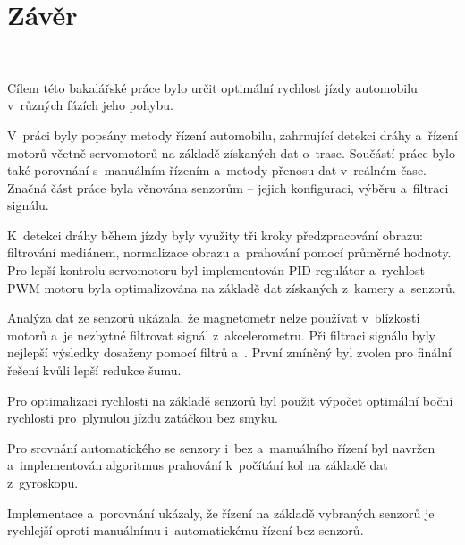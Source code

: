 \chapter{Závěr}
\label{sec:End}
\

Cílem této bakalářské práce bylo určit optimální rychlost jízdy automobilu v~různých
fázích jeho pohybu.

V~práci byly popsány metody řízení automobilu, zahrnující detekci dráhy a~řízení
motorů včetně servomotorů na základě získaných dat o~trase. Součástí práce bylo také
porovnání s~manuálním řízením a~metody přenosu dat v~reálném čase. Značná část práce
byla věnována senzorům – jejich konfiguraci, výběru a~filtraci signálu.

K~detekci dráhy během jízdy byly využity tři kroky předzpracování obrazu: filtrování
mediánem, normalizace obrazu a~prahování pomocí průměrné hodnoty. Pro lepší kontrolu
servomotoru byl implementován PID regulátor a~rychlost PWM motoru byla optimalizována
na základě dat získaných z~kamery a~senzorů.

Analýza dat ze senzorů ukázala, že magnetometr nelze používat v~blízkosti motorů a~je
nezbytné filtrovat signál z~akcelerometru. Při filtraci signálu byly nejlepší výsledky 
dosaženy pomocí filtrů  a~. První zmíněný byl zvolen pro finální řešení kvůli lepší redukce šumu.

Pro optimalizaci rychlosti na základě senzorů byl použit výpočet optimální boční
rychlosti pro~plynulou jízdu zatáčkou bez smyku.

Pro srovnání automatického se senzory i~bez a~manuálního řízení byl navržen 
a~implementován algoritmus prahování k~počítání kol na základě dat z~gyroskopu.

Implementace a~porovnání ukázaly, že řízení na základě vybraných senzorů je rychlejší
oproti manuálnímu i~automatickému řízení bez senzorů.

\endinput
